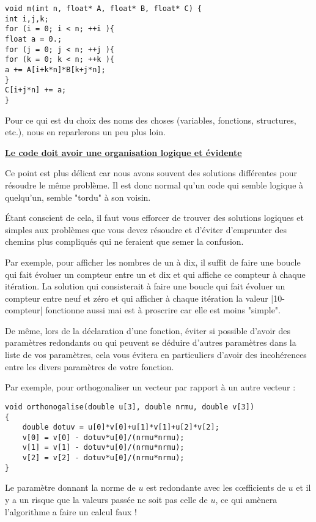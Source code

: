 \begin{lstlisting}[caption=Code sans indentation]
void m(int n, float* A, float* B, float* C) {
int i,j,k;
for (i = 0; i < n; ++i ){
float a = 0.;
for (j = 0; j < n; ++j ){
for (k = 0; k < n; ++k ){
a += A[i+k*n]*B[k+j*n];
}
C[i+j*n] += a;
}
\end{lstlisting}

Pour ce qui est du choix des noms des choses (variables, fonctions, structures, etc.), nous en reparlerons un peu plus loin.

\underline{\textbf{Le code doit avoir une organisation logique et évidente}}

Ce point est plus délicat car nous avons souvent des solutions différentes pour résoudre le même problème. Il est donc normal qu'un code qui semble logique à quelqu'un, semble "tordu" à son voisin.

\'Etant conscient de cela, il faut vous efforcer de trouver des solutions logiques et simples aux problèmes que vous devez résoudre et d'éviter d'emprunter des chemins plus compliqués qui ne feraient que semer la confusion. 

Par exemple, pour afficher les nombres de un à dix, il suffit de faire une boucle qui fait évoluer un compteur entre un et dix et qui affiche ce compteur à chaque itération.  La solution qui consisterait à faire une boucle qui fait évoluer un compteur entre neuf et zéro et qui afficher à chaque itération la valeur |10-compteur| fonctionne aussi mai est à proscrire car elle est moins "simple".

De même, lors de la déclaration d'une fonction, éviter si possible d'avoir des paramètres redondants ou qui peuvent se déduire d'autres paramètres dans la liste de vos paramètres, cela vous évitera en particuliers d'avoir des incohérences entre les divers paramètres de votre fonction.


Par exemple, pour orthogonaliser un vecteur par rapport à un autre vecteur :
\begin{lstlisting}[caption=Exemple de paramètre superflu]
void orthonogalise(double u[3], double nrmu, double v[3])
{
    double dotuv = u[0]*v[0]+u[1]*v[1]+u[2]*v[2];
    v[0] = v[0] - dotuv*u[0]/(nrmu*nrmu);
    v[1] = v[1] - dotuv*u[0]/(nrmu*nrmu);
    v[2] = v[2] - dotuv*u[0]/(nrmu*nrmu);
}
\end{lstlisting}

Le paramètre donnant la norme de $u$ est redondante avec les c{\oe}fficients de $u$ et il y a un risque que la valeurs
passée ne soit pas celle de $u$, ce qui amènera l'algorithme a faire un calcul faux ! 

